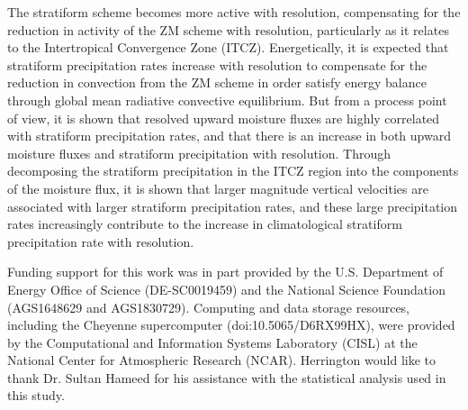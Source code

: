 \documentclass[times]{qjrms4}
\begin{document}
{\color{red}{What follows needs serious work}}

The stratiform scheme becomes more active with resolution, compensating for the reduction in activity of the ZM scheme with resolution, particularly as it relates to the Intertropical Convergence Zone (ITCZ). Energetically, it is expected that stratiform precipitation rates increase with resolution to compensate for the reduction in convection from the ZM scheme in order satisfy energy balance through global mean radiative convective equilibrium. But from a process point of view, it is shown that resolved upward moisture fluxes are highly correlated with stratiform precipitation rates, and that there is an increase in both upward moisture fluxes and stratiform precipitation with resolution. Through decomposing the stratiform precipitation in the ITCZ region into the components of the moisture flux, it is shown that larger magnitude vertical velocities are associated with larger stratiform precipitation rates, and these large precipitation rates increasingly contribute to the increase in climatological stratiform precipitation rate with resolution.

{\color{red}{Wrap up with a closing paragraph}}

\ack 
Funding support for this work was in part provided by the U.S. Department of Energy Office of Science (DE-SC0019459) and the National Science Foundation (AGS1648629 and AGS1830729). Computing and data storage resources, including the Cheyenne supercomputer (doi:10.5065/D6RX99HX), were provided by the Computational and Information Systems Laboratory (CISL) at the National Center for Atmospheric Research (NCAR). Herrington would like to thank Dr. Sultan Hameed for his assistance with the statistical analysis used in this study.



\end{document}

